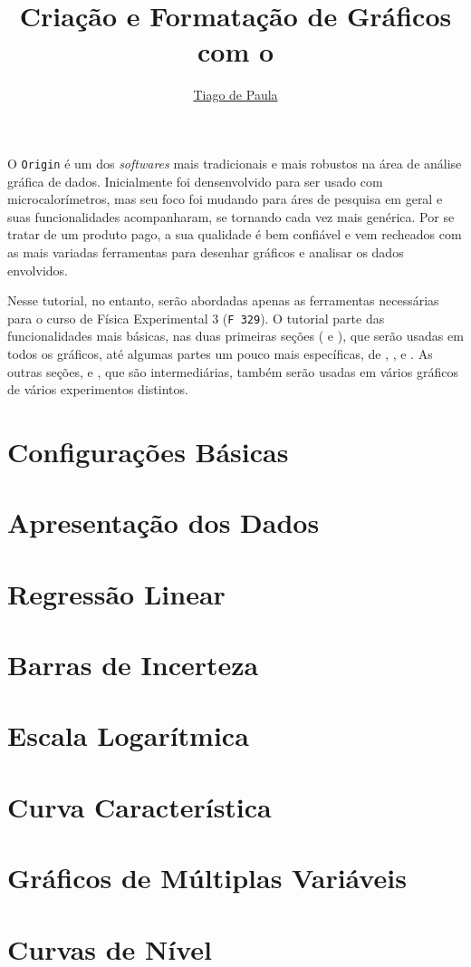 \documentclass{article}
\title{Criação e Formatação de Gráficos com o}\softwarelogo
\author{\href{mailto:t187679@dac.unicamp.br}{Tiago de Paula}}
\date{}
\begin{document}
    \maketitle

    O \texttt{Origin} é um dos \textit{softwares} mais tradicionais e mais robustos na área de análise gráfica de dados. Inicialmente foi densenvolvido para ser usado com microcalorímetros, mas seu foco foi mudando para áres de pesquisa em geral e suas funcionalidades acompanharam, se tornando cada vez mais genérica. Por se tratar de um produto pago, a sua qualidade é bem confiável e vem recheados com as mais variadas ferramentas para desenhar gráficos e analisar os dados envolvidos.

    Nesse tutorial, no entanto, serão abordadas apenas as ferramentas necessárias para o curso de Física Experimental 3 (\texttt{F 329}). O tutorial parte das funcionalidades mais básicas, nas duas primeiras seções ( e ), que serão usadas em todos os gráficos, até algumas partes um pouco mais específicas, de , ,  e . As outras seções,  e , que são intermediárias, também serão usadas em vários gráficos de vários experimentos distintos.

    \section{Configurações Básicas} \label{sec:basico}
        

    \section{Apresentação dos Dados} \label{sec:reta}
        

    \section{Regressão Linear} \label{sec:regres}
        

    \section{Barras de Incerteza} \label{sec:incert}
        

    \section{Escala Logarítmica} \label{sec:escala}
        

    \section{Curva Característica} \label{sec:caract}
        

    \section{Gráficos de Múltiplas Variáveis} \label{sec:multiv}
        

    \section{Curvas de Nível} \label{sec:contorno}
        
\end{document}
